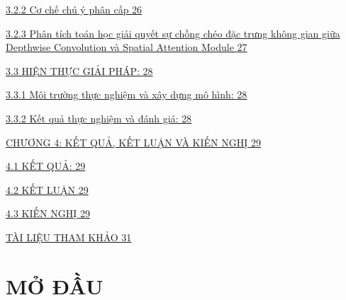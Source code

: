 \documentclass[
]{article}
\begin{document}
\protect\hyperlink{cux1a1-chux1ebf-chuxfa-uxfd-phuxe2n-cux1ea5p}{3.2.2
Cơ chế chú ý phân cấp
\protect\hyperlink{cux1a1-chux1ebf-chuxfa-uxfd-phuxe2n-cux1ea5p}{26}}

\protect\hyperlink{phuxe2n-tuxedch-touxe1n-hux1ecdc-giux1ea3i-quyux1ebft-sux1ef1-chux1ed3ng-chuxe9o-ux111ux1eb7c-trux1b0ng-khuxf4ng-gian-giux1eefa-depthwise-convolution-vuxe0-spatial-attention-module}{3.2.3
Phân tích toán học giải quyết sự chồng chéo đặc trưng không gian giữa
Depthwise Convolution và Spatial Attention Module
\protect\hyperlink{phuxe2n-tuxedch-touxe1n-hux1ecdc-giux1ea3i-quyux1ebft-sux1ef1-chux1ed3ng-chuxe9o-ux111ux1eb7c-trux1b0ng-khuxf4ng-gian-giux1eefa-depthwise-convolution-vuxe0-spatial-attention-module}{27}}

\protect\hyperlink{hiux1ec7n-thux1ef1c-giux1ea3i-phuxe1p}{3.3 HIỆN THỰC
GIẢI PHÁP:
\protect\hyperlink{hiux1ec7n-thux1ef1c-giux1ea3i-phuxe1p}{28}}

\protect\hyperlink{muxf4i-trux1b0ux1eddng-thux1ef1c-nghiux1ec7m-vuxe0-xuxe2y-dux1ef1ng-muxf4-huxecnh}{3.3.1
Môi trường thực nghiệm và xây dựng mô hình:
\protect\hyperlink{muxf4i-trux1b0ux1eddng-thux1ef1c-nghiux1ec7m-vuxe0-xuxe2y-dux1ef1ng-muxf4-huxecnh}{28}}

\protect\hyperlink{kux1ebft-quux1ea3-thux1ef1c-nghiux1ec7m-vuxe0-ux111uxe1nh-giuxe1}{3.3.2
Kết quả thực nghiệm và đánh giá:
\protect\hyperlink{kux1ebft-quux1ea3-thux1ef1c-nghiux1ec7m-vuxe0-ux111uxe1nh-giuxe1}{28}}

\protect\hyperlink{chux1b0ux1a1ng-4-kux1ebft-quux1ea3-kux1ebft-luux1eadn-vuxe0-kiux1ebfn-nghux1ecb}{CHƯƠNG
4: KẾT QUẢ, KẾT LUẬN VÀ KIẾN NGHỊ
\protect\hyperlink{chux1b0ux1a1ng-4-kux1ebft-quux1ea3-kux1ebft-luux1eadn-vuxe0-kiux1ebfn-nghux1ecb}{29}}

\protect\hyperlink{kux1ebft-quux1ea3}{4.1 KẾT QUẢ:
\protect\hyperlink{kux1ebft-quux1ea3}{29}}

\protect\hyperlink{kux1ebft-luux1eadn}{4.2 KẾT LUẬN
\protect\hyperlink{kux1ebft-luux1eadn}{29}}

\protect\hyperlink{kiux1ebfn-nghux1ecb}{4.3 KIẾN NGHỊ
\protect\hyperlink{kiux1ebfn-nghux1ecb}{29}}

\protect\hyperlink{tuxe0i-liux1ec7u-tham-khux1ea3o}{TÀI LIỆU THAM KHẢO
\protect\hyperlink{tuxe0i-liux1ec7u-tham-khux1ea3o}{31}}

\hypertarget{mux1edf-ux111ux1ea7u}{%
\section{MỞ ĐẦU}\label{mux1edf-ux111ux1ea7u}}
\end{document}
